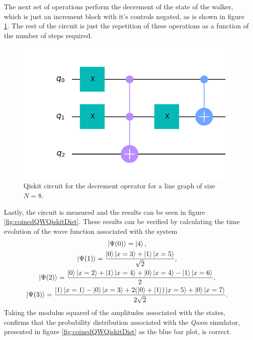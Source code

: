 \documentclass[../../dissertation.tex]{subfiles}
\begin{document}
The next set of operations perform the decrement of the state of the walker,
which is just an increment block with it's controls negated, as is shown in
figure \ref{fig:decrCircuitQistkit}. The rest of the circuit is just the
repetition of these operations as a function of the number of steps required.
\begin{figure}[!h]
	\centering
	\includegraphics[scale=0.32]{img/Qiskit/CoinedQuantumWalk/Circuits/circDecr_N3_S3.png}
	\caption{Qiskit circuit for the decrement operator for a line graph of size $N=8$.} 
	\label{fig:decrCircuitQistkit}
\end{figure}\par
Lastly, the circuit is measured and the results can be seen in figure
\ref{fig:coinedQWQiskitDist}. These results can be verified by calculating the
time evolution of the wave function associated with the system
\begin{gather}
	\ket{\Psi(0)} = \ket{4},\\
	\ket{\Psi(1)} = \frac{\ket{0}\ket{x=3}+\ket{1}\ket{x=5}}{\sqrt{2}}, \\
	\ket{\Psi(2)} = \frac{\ket{0}\ket{x=2}+\ket{1}\ket{x=4}+\ket{0}\ket{x=4}-\ket{1}\ket{x=6}}{2},\\
	\ket{\Psi(3)} = \frac{\ket{1}\ket{x=1}-\ket{0}\ket{x=3}+2(\ket{0}+\ket{1})\ket{x=5}+\ket{0}\ket{x=7}}{2\sqrt{2}}.
\end{gather}
Taking the modulus squared of the amplitudes associated with the states,
confirms that the probability distribution associated with the \textit{Qasm}
simulator, presented in figure \ref{fig:coinedQWQiskitDist} as the blue bar
plot, is correct. 
\end{document}
